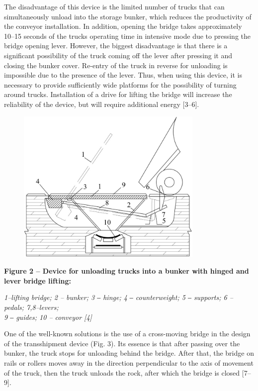 The disadvantage of this device is the limited number of trucks that can
simultaneously unload into the storage bunker, which reduces the
productivity of the conveyor installation. In addition, opening the
bridge takes approximately 10--15 seconds of the truck\textquotesingle s
operating time in intensive mode due to pressing the bridge opening
lever. However, the biggest disadvantage is that there is a significant
possibility of the truck coming off the lever after pressing it and
closing the bunker cover. Re-entry of the truck in reverse for unloading
is impossible due to the presence of the lever. Thus, when using this
device, it is necessary to provide sufficiently wide platforms for the
possibility of turning around trucks. Installation of a drive for
lifting the bridge will increase the reliability of the device, but will
require additional energy {[}3--6{]}.

\begin{figure}[H]
	\centering
	\includegraphics[width=0.8\textwidth]{assets/1351}
	\caption*{}
\end{figure}

{\bfseries Figure 2 -- Device for unloading trucks into a bunker with
hinged and lever bridge lifting:}

\emph{1--lifting bridge; 2 -- bunker; 3 ‒ hinge; 4 ‒ counterweight; 5 ‒
supports; 6 -- pedals; 7,8--levers;\\
9 ‒ guides; 10 -- conveyor {[}4{]}}

One of the well-known solutions is the use of a cross-moving bridge in
the design of the transshipment device (Fig. 3). Its essence is that
after passing over the bunker, the truck stops for unloading behind the
bridge. After that, the bridge on rails or rollers moves away in the
direction perpendicular to the axis of movement of the truck, then the
truck unloads the rock, after which the bridge is closed {[}7--9{]}.

